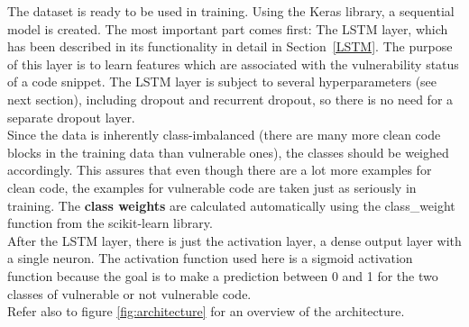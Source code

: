 \documentclass[
a4paper,
pagesize,
pdftex,
12pt,
twoside, %
BCOR=5mm, %
ngerman,
fleqn,
final,
]{scrartcl}
\begin{document}
	The dataset is ready to be used in training. Using the Keras library, a sequential model is created. The most important part comes first: The LSTM layer, which has been described in its functionality in detail in Section~\ref{LSTM}. The purpose of this layer is to learn features which are associated with the vulnerability status of a code snippet. The LSTM layer is subject to several hyperparameters (see next section), including dropout and recurrent dropout, so there is no need for a separate dropout layer. \\
	Since the data is inherently class-imbalanced (there are many more clean code blocks in the training data than vulnerable ones), the classes should be weighed accordingly. This assures that even though there are a lot more examples for clean code, the examples for vulnerable code are taken just as seriously in training. The \textbf{class weights} are calculated automatically using the class\_weight function from the scikit-learn library.\\
	After the LSTM layer, there is just the activation layer, a dense output layer with a single neuron. The activation function used here is a sigmoid activation function because the goal is to make a prediction between 0 and 1 for the two classes of vulnerable or not vulnerable code.\\
	Refer also to figure \ref{fig:architecture} for an overview of the architecture.
	
\end{document}
